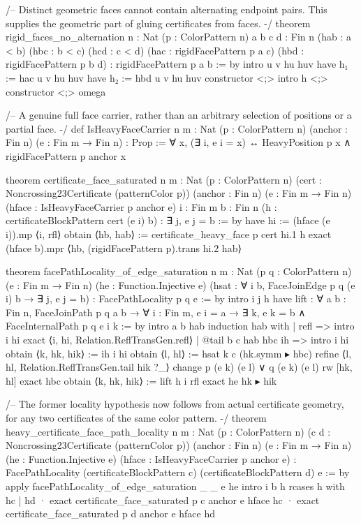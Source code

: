 \documentclass[11pt,reqno]{amsart}
\theoremstyle{definition}
\begin{document}
\begin{LeanCode}
/-- Distinct geometric faces cannot contain alternating endpoint pairs.
This supplies the geometric part of gluing certificates from faces. -/
theorem rigid_faces_no_alternation {n : Nat} (p : ColorPattern n)
    {a b c d : Fin n} (hab : a < b) (hbc : b < c) (hcd : c < d)
    (hac : rigidFacePattern p a c) (hbd : rigidFacePattern p b d) :
    rigidFacePattern p a b := by
  intro u v hu huv
  have h₁ := hac u v hu huv
  have h₂ := hbd u v hu huv
  constructor <;> intro h <;> constructor <;> omega

/-- A genuine full face carrier, rather than an arbitrary selection of
positions or a partial face. -/
def IsHeavyFaceCarrier {n m : Nat} (p : ColorPattern n)
    (anchor : Fin n) (e : Fin m → Fin n) : Prop :=
  ∀ x, (∃ i, e i = x) ↔ HeavyPosition p x ∧ rigidFacePattern p anchor x

theorem certificate_face_saturated {n m : Nat} (p : ColorPattern n)
    (cert : Noncrossing23Certificate (patternColor p))
    (anchor : Fin n) (e : Fin m → Fin n)
    (hface : IsHeavyFaceCarrier p anchor e)
    {i : Fin m} {b : Fin n} (h : certificateBlockPattern cert (e i) b) :
    ∃ j, e j = b := by
  have hi := (hface (e i)).mp ⟨i, rfl⟩
  obtain ⟨hb, hab⟩ := certificate_heavy_face p cert hi.1 h
  exact (hface b).mpr ⟨hb, (rigidFacePattern p).trans hi.2 hab⟩

theorem facePathLocality_of_edge_saturation {n m : Nat}
    (p q : ColorPattern n) (e : Fin m → Fin n)
    (he : Function.Injective e)
    (hsat : ∀ i b, FaceJoinEdge p q (e i) b → ∃ j, e j = b) :
    FacePathLocality p q e := by
  intro i j h
  have lift : ∀ {a b : Fin n}, FaceJoinPath p q a b →
      ∀ i : Fin m, e i = a → ∃ k, e k = b ∧ FaceInternalPath p q e i k := by
    intro a b hab
    induction hab with
    | refl =>
        intro i hi
        exact ⟨i, hi, Relation.ReflTransGen.refl⟩
    | @tail b c hab hbc ih =>
        intro i hi
        obtain ⟨k, hk, hik⟩ := ih i hi
        obtain ⟨l, hl⟩ := hsat k c (hk.symm ▸ hbc)
        refine ⟨l, hl, Relation.ReflTransGen.tail hik ?_⟩
        change p (e k) (e l) ∨ q (e k) (e l)
        rw [hk, hl]
        exact hbc
  obtain ⟨k, hk, hik⟩ := lift h i rfl
  exact he hk ▸ hik

/-- The former locality hypothesis now follows from actual certificate
geometry, for any two certificates of the same color pattern. -/
theorem heavy_certificate_face_path_locality {n m : Nat} (p : ColorPattern n)
    (c d : Noncrossing23Certificate (patternColor p))
    (anchor : Fin n) (e : Fin m → Fin n) (he : Function.Injective e)
    (hface : IsHeavyFaceCarrier p anchor e) :
    FacePathLocality (certificateBlockPattern c) (certificateBlockPattern d) e := by
  apply facePathLocality_of_edge_saturation _ _ e he
  intro i b h
  rcases h with hc | hd
  · exact certificate_face_saturated p c anchor e hface hc
  · exact certificate_face_saturated p d anchor e hface hd


\end{LeanCode}
\end{document}
